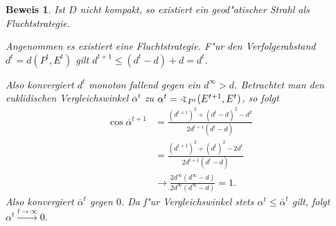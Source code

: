 \documentclass[paper=A4, twoside, chapterprefix=true, bibliography=totoc, headsepline]{scrbook}
\newcommand{\tikzgitter}[3][0.25]{ %
	\draw[step=#1,gray!15] #2 grid #3;
	\draw[step=2*#1,gray!30] #2 grid #3;
	\fill (0,0) circle(0.1); 
}
\theoremstyle{nonumberbreak}
\newtheorem{bew}{Beweis}
\theoremstyle{emptybreak}
\theoremstyle{break}
\begin{document}
\begin{bew}
Ist $D$ nicht kompakt, so existiert ein geod"atischer Strahl als Fluchtstrategie.

Angenommen es existiert eine Fluchtstrategie. F"ur den Verfolgerabstand $d^t = d(P^t, E^t)$ gilt $d^{t+1} \le (d^t - d) + d = d^t$.
\begin{center}\end{center}
Also konvergiert $d^t$ monoton fallend gegen ein $d^\infty > d$.
Betrachtet man den euklidischen Vergleichswinkel $\overline{\alpha}^t$ zu $\alpha^t = \varangle_{P^t}(E^{t+1}, E^t)$, so folgt
\begin{align*}
	\cos \overline{\alpha}^{t+1} &= \frac{(d^{t+1})^2 + (d^t - d)^2 - d^2}{2d^{t+1}(d^t - d)} \\
	&= \frac{(d^{t+1})^2 + (d^t)^2 - 2d^t}{2d^{t+1}(d^t - d)} \\
	&\rightarrow \frac{2d^\infty(d^\infty - d)}{2d^\infty(d^\infty - d)} = 1.
\end{align*}
Also konvergiert $\overline{\alpha}^t$ gegen $0$.
Da f"ur Vergleichswinkel stets $\alpha^t \le \overline{\alpha}^t$ gilt, folgt $\alpha^t \xrightarrow{t \to \infty} 0$.
\end{bew}
\end{document}
